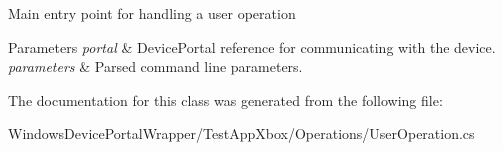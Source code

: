 Main entry point for handling a user operation 


\begin{DoxyParams}{Parameters}
{\em portal} & Device\+Portal reference for communicating with the device.\\
\hline
{\em parameters} & Parsed command line parameters.\\
\hline
\end{DoxyParams}


The documentation for this class was generated from the following file\+:\begin{DoxyCompactItemize}
\item 
Windows\+Device\+Portal\+Wrapper/\+Test\+App\+Xbox/\+Operations/User\+Operation.\+cs\end{DoxyCompactItemize}
